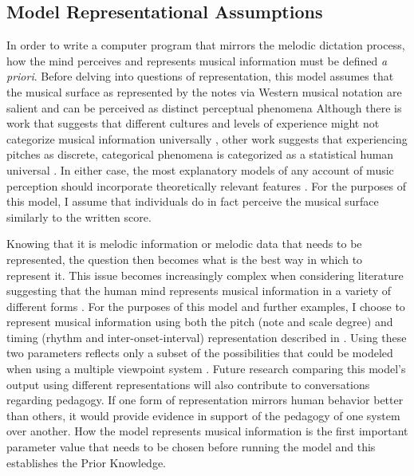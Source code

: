 \documentclass[12pt,]{book}
\begin{document}
\hypertarget{model-representational-assumptions}{%
\subsection{Model Representational Assumptions}\label{model-representational-assumptions}}

In order to write a computer program that mirrors the melodic dictation process, how the mind perceives and represents musical information must be defined \emph{a priori}.
Before delving into questions of representation, this model assumes that the musical surface as represented by the notes via Western musical notation are salient and can be perceived as distinct perceptual phenomena
Although there is work that suggests that different cultures and levels of experience might not categorize musical information universally \citep{mcdermottIndifferenceDissonanceNative2016}, other work suggests that experiencing pitches as discrete, categorical phenomena is categorized as a statistical human universal \citep{savageStatisticalUniversalsReveal2015}.
In either case, the most explanatory models of any account of music perception should incorporate theoretically relevant features \citep{harrisonDissociatingSensoryCognitive2018}.
For the purposes of this model, I assume that individuals do in fact perceive the musical surface similarly to the written score.

Knowing that it is melodic information or melodic data that needs to be represented, the question then becomes what is the best way in which to represent it.
This issue becomes increasingly complex when considering literature suggesting that the human mind represents musical information in a variety of different forms \citep{krumhanslCognitiveFoundationsMusical2001, levitinCurrentAdvancesCognitive2009}.
For the purposes of this model and further examples, I choose to represent musical information using both the pitch (note and scale degree) and timing (rhythm and inter-onset-interval) representation described in \citet{pearceStatisticalLearningProbabilistic2018a}.
Using these two parameters reflects only a subset of the possibilities that could be modeled when using a multiple viewpoint system \citep{conklinMultipleViewpointSystems1995}.
Future research comparing this model's output using different representations will also contribute to conversations regarding pedagogy.
If one form of representation mirrors human behavior better than others, it would provide evidence in support of the pedagogy of one system over another.
How the model represents musical information is the first important parameter value that needs to be chosen before running the model and this establishes the Prior Knowledge.
\end{document}
